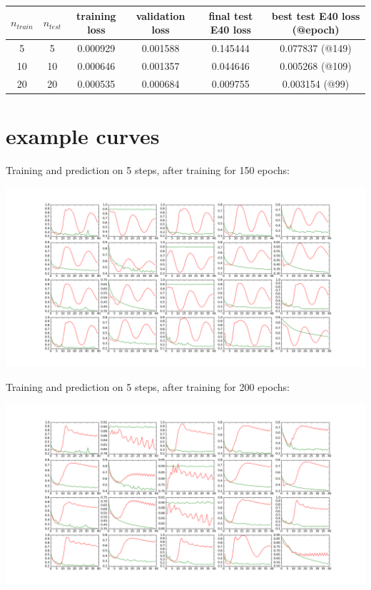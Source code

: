 \documentclass[a4paper,10pt]{article}
\begin{document}
\begin{tabular}{|c|c|c|c|c|c|}
 \hline
 $n_{train}$ & $n_{test}$ & training loss & validation loss & final test E40 loss & best test E40 loss (@epoch) \\
 \hline
 5 & 5 & 0.000929 & 0.001588 & 0.145444 & 0.077837 (@149) \\
 10 & 10 & 0.000646 & 0.001357 & 0.044646 & 0.005268 (@109) \\
 20 & 20 & 0.000535 & 0.000684 & 0.009755 & 0.003154 (@99) \\
 \hline
\end{tabular}


\section{example curves}

Training and prediction on 5 steps, after training for 150 epochs:

\includegraphics[width=\textwidth]{../../figures/LSTM_m2m_5_steps_epoch_149}

Training and prediction on 5 steps, after training for 200 epochs:

\includegraphics[width=\textwidth]{../../figures/LSTM_m2m_5_steps_epoch_199}
\end{document}
